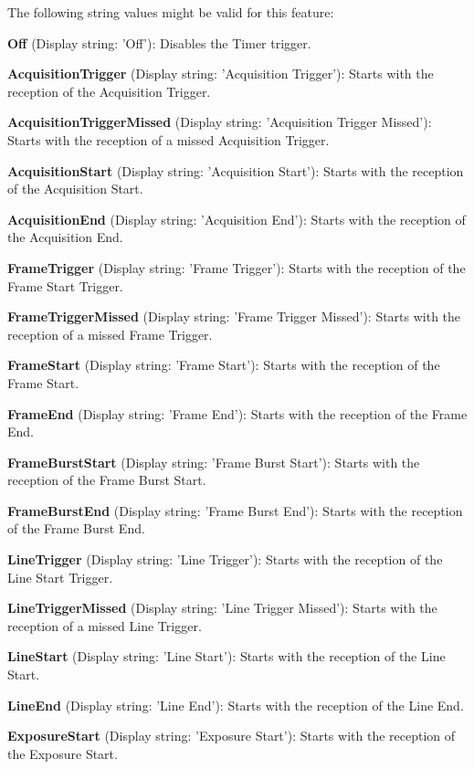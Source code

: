 The following string values might be valid for this feature\+:
\begin{DoxyItemize}
\item {\bfseries Off} (Display string\+: 'Off')\+: Disables the Timer trigger.
\item {\bfseries Acquisition\+Trigger} (Display string\+: 'Acquisition Trigger')\+: Starts with the reception of the Acquisition Trigger.
\item {\bfseries Acquisition\+Trigger\+Missed} (Display string\+: 'Acquisition Trigger Missed')\+: Starts with the reception of a missed Acquisition Trigger.
\item {\bfseries Acquisition\+Start} (Display string\+: 'Acquisition Start')\+: Starts with the reception of the Acquisition Start.
\item {\bfseries Acquisition\+End} (Display string\+: 'Acquisition End')\+: Starts with the reception of the Acquisition End.
\item {\bfseries Frame\+Trigger} (Display string\+: 'Frame Trigger')\+: Starts with the reception of the Frame Start Trigger.
\item {\bfseries Frame\+Trigger\+Missed} (Display string\+: 'Frame Trigger Missed')\+: Starts with the reception of a missed Frame Trigger.
\item {\bfseries Frame\+Start} (Display string\+: 'Frame Start')\+: Starts with the reception of the Frame Start.
\item {\bfseries Frame\+End} (Display string\+: 'Frame End')\+: Starts with the reception of the Frame End.
\item {\bfseries Frame\+Burst\+Start} (Display string\+: 'Frame Burst Start')\+: Starts with the reception of the Frame Burst Start.
\item {\bfseries Frame\+Burst\+End} (Display string\+: 'Frame Burst End')\+: Starts with the reception of the Frame Burst End.
\item {\bfseries Line\+Trigger} (Display string\+: 'Line Trigger')\+: Starts with the reception of the Line Start Trigger.
\item {\bfseries Line\+Trigger\+Missed} (Display string\+: 'Line Trigger Missed')\+: Starts with the reception of a missed Line Trigger.
\item {\bfseries Line\+Start} (Display string\+: 'Line Start')\+: Starts with the reception of the Line Start.
\item {\bfseries Line\+End} (Display string\+: 'Line End')\+: Starts with the reception of the Line End.
\item {\bfseries Exposure\+Start} (Display string\+: 'Exposure Start')\+: Starts with the reception of the Exposure Start.

\end{DoxyItemize}
